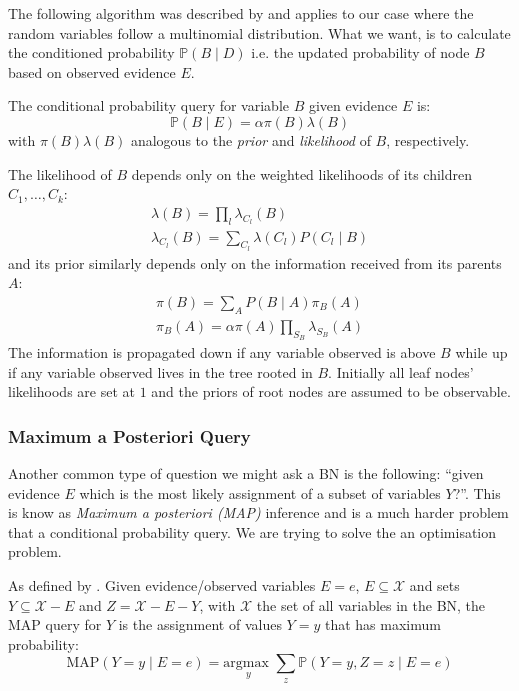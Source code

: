 The following algorithm was described by \cite{Normand1992} and applies to our case where the random variables follow a multinomial distribution.
What we want, is to calculate the conditioned probability $\mathbb{P}(B \mid D)$ i.e. the updated probability of node $B$ based on observed evidence $E$.
\begin{definition}
	The conditional probability query for variable $B$ given evidence $E$ is:
\begin{equation} \label{eq:bnupdating}
	\mathbb{P}(B \mid E) = \alpha \pi(B) \lambda(B)
\end{equation}
with $\pi(B) \lambda(B)$ analogous to the \textit{prior} and \textit{likelihood} of $B$, respectively.
\end{definition}
The likelihood of $B$ depends only on the weighted likelihoods of its children $C_1, \ldots ,C_k$:\begin{align}
	\lambda(B) = \prod_l \lambda_{C_l}(B) \\
	\lambda_{C_{l}}(B)=\sum_{C_{l}} \lambda\left(C_{l}\right) P\left(C_{l} \mid B\right)
\end{align}
and its prior similarly depends only on the information received from its parents $A$:
\begin{align}
	\pi(B)=\sum_{A} P(B \mid A) \pi_{B}(A) \\
	\pi_{B}(A)=\alpha \pi(A) \prod_{S_{B}} \lambda_{S_{B}}(A)
\end{align}
The information is propagated down if any variable observed is above $B$ while up if any variable observed lives in the tree rooted in $B$.
Initially all leaf nodes' likelihoods are set at $1$ and the priors of root nodes are assumed to be observable.

\subsubsection{Maximum a Posteriori Query}
Another common type of question we might ask a BN is the following: ``given evidence $E$ which is the most likely assignment of a subset of variables $Y$?''.
This is know as \textit{Maximum a posteriori (MAP)} inference and is a much harder problem that a conditional probability query.
We are trying to solve the an optimisation problem.
\begin{definition}
As defined by \cite{koller2007introduction}.
Given evidence/observed variables $E=e$, $E \subseteq \mathcal{X}$ and sets $Y \subseteq \mathcal{X} - E$ and $Z = \mathcal{X} - E - Y$, with $\mathcal{X}$ the set of all variables in the BN, the MAP query for $Y$ is the assignment of values $Y=y$ that has maximum probability:
	\begin{equation} \label{eq:map}
	\text{MAP}( Y=y \mid E=e ) = \underset{y}{\text{argmax }}  \sum_z \mathbb{P}(Y=y, Z=z \mid E=e)
\end{equation}
\end{definition}

